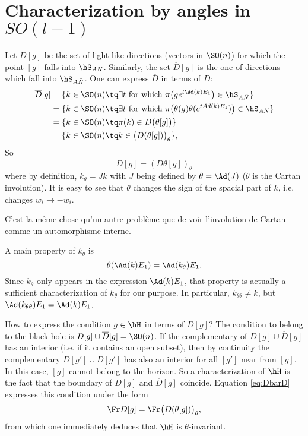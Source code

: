 
\section{Characterization by angles in \texorpdfstring{$SO(l-1)$}{SOl-1}}

Let $D[g]$ be the set of light-like directions (vectors in $\SO(n)$) for which the point $[g]$ falls into $\hS_{AN}$. Similarly, the set $\overline{D}[g]$ is the one of directions which fall into $\hS_{A \bar{N}}$. One can express $\overline{ D }$ in terms of $D$:
\[
\begin{split}
\overline{ D }[g]&=\{ k\in\SO(n)\tq\exists t\text{ for which }\pi\big( g e^{t\Ad(k)E_1} \big)\in\hS_{A\bar N} \}\\
		&=\{ k\in\SO(n)\tq\exists t\text{ for which }\pi\big( \theta(g)\theta( e^{tAd(k)E_1}) \big)\in\hS_{AN}\}\\
		&=\{ k\in\SO(n)\tq \pi(k)\in D\big( \theta[g] \big)\}\\
		&=\{ k\in\SO(n)\tq k\in\big( D(\theta[g]) \big)_{\theta}\},
\end{split}
\]
So
\begin{equation} \label{eq:DbarD}
\overline{D}[g]=(D\theta[g])_{\theta}
\end{equation}
where by definition, $k_{\theta}=Jk$ with $J$ being defined by $\theta=\Ad(J)$ ($\theta$ is the Cartan involution). It is easy to see that $\theta$ changes the sign of the spacial part of $k$, i.e. changes $w_i\to -w_i$.

\begin{probleme}
C'est la même chose qu'un autre problème que de voir l'involution de Cartan comme un automorphisme interne.
\label{propCrtadeux}
\end{probleme}

 A main property of $k_{\theta}$ is
\[
	\theta(\Ad(k)E_1)=\Ad(k_{\theta})E_1.
\]
Since $k_{\theta}$ only appears in the expression $\Ad(k)E_1$, that property is actually a sufficient characterization of $k_{\theta}$ for our purpose. In particular, $k_{\theta\theta}\neq k$, but $\Ad(k_{\theta\theta})E_1=\Ad(k)E_1$.

How to express the condition $g\in\hH$ in terms of $D[g]$? The condition to belong to the black hole is $D[g]\cup \overline{D}[g]=\SO(n)$. If the complementary of $D[g]\cup \overline{D}[g]$ has an interior (i.e. if it contains an open subset), then by continuity the complementary $D[g']\cup \overline{D}[g']$ has also an interior for all $[g']$ near from $[g]$. In this case, $[g]$ cannot belong to the horizon. So a characterization of $\hH$ is the fact that the boundary of $D[g]$ and $\overline{D}[g]$ coincide. Equation \eqref{eq:DbarD} expresses this condition under the form
\begin{equation}
  \Fr D[g]=\Fr \big( D(\theta[g])\big)_{\theta},
 \end{equation}
from which one immediately deduces that $\hH$ is $\theta$-invariant.

